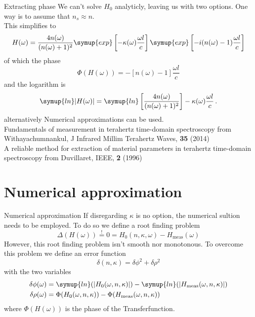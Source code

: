 \documentclass[aspectratio=1610, 9pt]{beamer}
\begin{document}
\begin{frame}{Extracting phase}
  We can't solve $H_0$ analyticly, leaving us with two options.
  One way is to assume that $n_s \approx n$.\\
  This simplifies to 
  \begin{equation}
    H(\omega) = \frac{4n(\omega)}{(n(\omega) + 1)^2} \symup{exp}\left[-\kappa(\omega) \frac{\omega l }{c}\right] \symup{exp}\left[- i(n(\omega) - 1) \frac{\omega l}{c}\right]
  \end{equation}
  of which the phase
  \begin{equation}
    \Phi(H(\omega)) = -[n(\omega) - 1] \frac{\omega l}{c}
  \end{equation}
  and the logarithm is
  \begin{equation}
    \symup{ln}|H(\omega)| = \symup{ln}\left[ \frac{4n(\omega)}{(n(\omega) +1)^2}\right] - \kappa(\omega) \frac{\omega l}{c} \, .
  \end{equation}
alternatively Numerical approximations can be used.\\
\textcolor{tugreen}{Fundamentals of measurement in terahertz time-domain spectroscopy} from Withayachumnankul, J Infrared Millim Terahertz Waves, \textbf{35} (2014)\\
\textcolor{tugreen}{A reliable method for extraction of material parameters in terahertz time-domain spectroscopy} from Duvillaret, IEEE, \textbf{2} (1996)
\end{frame}

\section{Numerical approximation}
\begin{frame}{Numerical approximation}
  If disregarding $\kappa$ is no option, the numerical sultion needs to be employed.
  To do so we define a root finding problem 
  \begin{equation}
    \Delta(H(\omega)) \overset{!}{=} 0 = H_0(n, \kappa, \omega) - H_\text{meas}(\omega)
  \end{equation}
  However, this root finding problem isn't smooth nor monotonous.
  To overcome this problem we define an error function 
  \begin{equation}
    \delta(n, \kappa) = \delta \phi^2 + \delta \rho^2
  \end{equation}
  with the two variables 
  \begin{align}
    \delta \phi(\omega) &= \symup{ln}(\left| H_0(\omega, n , \kappa)\right|) - \symup{ln}(\left| H_\text{meas}(\omega, n , \kappa)\right|) \\
    \delta \rho(\omega) &= \Phi(H_0(\omega, n , \kappa)) - \Phi(H_\text{meas}(\omega, n , \kappa))
  \end{align}
  where $\Phi(H(\omega))$ is the phase of the Transferfunction.
\end{frame}
\end{document}

